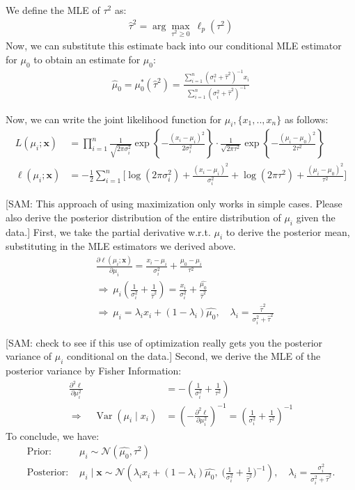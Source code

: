 \documentclass[letterpaper, 11pt]{extarticle}
\newcommand{\sam}[1]{
  {\color{blue} [SAM: {#1}]}
 }
\begin{document}
We define the MLE of $\tau^2$ as:
\begin{align}
    \ \hat{\tau}^2=\arg\max_{\tau^2\ge 0}\ \ell_p(\tau^2)\
\end{align}
Now, we can substitute this estimate back into our conditional MLE estimator for $\mu_0$ to obtain an estimate for $\mu_0$:
\begin{align}
    \ \hat{\mu}_0=\mu_0^*(\hat{\tau}^2)
=\frac{\sum_{i=1}^{n} (\sigma_i^2+\hat{\tau}^2)^{-1} x_i}
{\sum_{i=1}^{n} (\sigma_i^2+\hat{\tau}^2)^{-1}}\
\end{align}


Now, we can write the joint  likelihood function for $\mu_i, \{x_1,..,x_n\}$ as follows:
\begin{align}
L(\mu_i; \mathbf{x})
&=\prod_{i=1}^{n}
\frac{1}{\sqrt{2\pi\sigma_i^2}}
\exp\!\left\{-\frac{(x_i-\mu_i)^2}{2\sigma_i^2}\right\}
\cdot
\frac{1}{\sqrt{2\pi\tau^2}}
\exp\!\left\{-\frac{(\mu_i-\mu_0)^2}{2\tau^2}\right\}\\
\ell(\mu_i; \mathbf{x})
&= -\frac{1}{2}\sum_{i=1}^{n}\Bigg[
\log(2\pi\sigma_i^2)+\frac{(x_i-\mu_i)^2}{\sigma_i^2}
+\log(2\pi\tau^2)+\frac{(\mu_i-\mu_0)^2}{\tau^2}
\Bigg]
\end{align}


\sam{This approach of using maximization  only works in simple cases.  Please also derive the posterior distribution of the entire distribution of $\mu_i$ given the data.} First, we take the partial derivative w.r.t. $\mu_i$ to derive the posterior mean, substituting in the MLE estimators we derived above.
\begin{align}
    &\frac{\partial \ell(\mu_i; \mathbf{x})}{\partial \mu_i}
= \frac{x_i-\mu_i}{\sigma_i^2}+\frac{\mu_0-\mu_i}{\tau^2}\\
&\Rightarrow\ \mu_i\left(\frac{1}{\sigma_i^2}+\frac{1}{\hat{\tau}^2}\right)
=\frac{x_i}{\sigma_i^2}+\frac{\hat{\mu_0}}{\hat{\tau}^2}
\\&\Rightarrow
\ \mu_i
=\lambda_i x_i+(1-\lambda_i)\hat{\mu_0}, \quad 
\lambda_i=\frac{\hat{\tau}^2}{\sigma_i^2+\hat{\tau}^2}
\end{align}
\sam{check to see if this use of optimization really gets you the posterior variance of $\mu_i$ conditional on the data.} Second, we derive the MLE of the posterior variance by Fisher Information:
\begin{align}
\frac{\partial^2 \ell}{\partial \mu_i^2} 
&= -\left( \frac{1}{\sigma_i^2} + \frac{1}{\tau^2} \right) \\[8pt]
\Rightarrow\quad 
\operatorname{Var}(\mu_i \mid x_i) 
&= \left( -\frac{\partial^2 \ell}{\partial \mu_i^2} \right)^{-1} 
= \left( \frac{1}{\sigma_i^2} + \frac{1}{\tau^2} \right)^{-1}
\end{align}
To conclude, we have:
\begin{align}
    \textrm{Prior: }&\mu_i \sim \mathcal{N}(\hat{\mu_0}, \tau^2)\\
    \textrm{Posterior: }& \mu_i \mid \mathbf{x} \sim \mathcal{N}\left(
\lambda_i x_i+(1-\lambda_i)\hat{\mu_0},\;
\Big(\frac{1}{\sigma_i^2}+\frac{1}{\hat{\tau}^2}\Big)^{-1}
\right), \quad \lambda_i=\frac{\sigma_i^2}{\sigma_i^2+\hat{\tau}^2}.
\end{align}
\hline
{}
\end{document}

